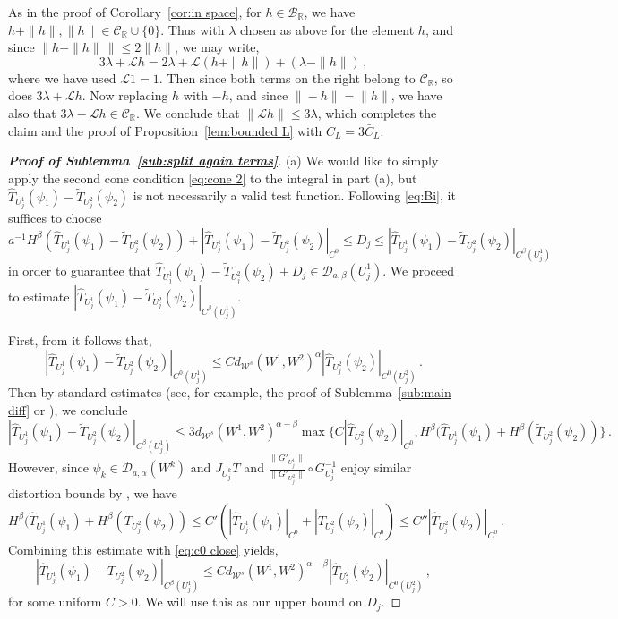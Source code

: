 \documentclass{amsart}
\numberwithin{equation}{section}
\newcommand\cB{{\mathcal B}}
\newcommand\cC{{\mathcal C}}
\newcommand\cD{{\mathcal D}}
\newcommand\cL{{\mathcal L}}
\newcommand\cW{{\mathcal W}}
\newcommand\bR{{\mathbb R}}
\newcommand\tT{\widetilde{T}}
\newcommand{\hT}{\widehat{T}}
\begin{document}
As in the proof of Corollary~\ref{cor:in space}, for $h \in \cB_{\bR}$, we have 
$h + \| h \|, \| h \| \in \cC_{\bR} \cup \{ 0 \}$.  Thus with $\lambda$ chosen as above for the element
$h$, and since $\| h + \| h \| \, \| \le 2 \| h\|$, we may write,
\[
3\lambda + \cL h = 2\lambda + \cL (h + \| h \|) + (\lambda - \| h \|) \, ,
\]
where we have used $\cL 1 = 1$.  Then since both terms on the right belong to $\cC_{\bR}$,
so does $3 \lambda + \cL h$.  Now replacing $h$ with $-h$, and since $\| -h \| = \| h \|$, we have
also that $3\lambda - \cL h \in \cC_{\bR}$.  We conclude that $\| \cL h \| \le 3\lambda$,
which completes the claim and the proof of 
Proposition~\ref{lem:bounded L} with $C_L = 3 \bar C_L$.
\begin{proof}[\bf \em Proof of Sublemma~\ref{sub:split again terms}]
(a)  We would like to simply apply the second cone condition \eqref{eq:cone 2} to the integral
in part (a), but $\hT_{U^1_j}(\psi_1) - \tT_{U^2_j}(\psi_2)$ is not necessarily a valid test function.
Following \eqref{eq:Bi}, it suffices to choose 
\[
a^{-1} H^\beta(\hT_{U^1_j}(\psi_1) - \tT_{U^2_j}(\psi_2))
+ |\hT_{U^1_j}(\psi_1) - \tT_{U^2_j}(\psi_2)|_{C^0} \le D_j \le |\hT_{U^1_j}(\psi_1) - \tT_{U^2_j}(\psi_2)|_{C^\beta(U^1_j)}
\]
in order to guarantee that $\hT_{U^1_j}(\psi_1) - \tT_{U^2_j}(\psi_2) + D_j \in \cD_{a, \beta}(U^1_j)$.
We proceed to estimate $|\hT_{U^1_j}(\psi_1) - \tT_{U^2_j}(\psi_2)|_{C^\beta(U^1_j)}$.

First, from \cite[eq.~(5.18)]{DL22} it follows that,
\begin{equation}
\label{eq:c0 close}
|\hT_{U^1_j}(\psi_1) - \tT_{U^2_j}(\psi_2)|_{C^0(U^1_j)} \le C d_{\cW^s}(W^1, W^2)^\alpha 
|\hT_{U^2_j}(\psi_2)|_{C^0(U^2_j)} \, .
\end{equation}
Then by standard estimates (see, for example, the proof of Sublemma~\ref{sub:main diff} or
\cite[Lemma~4.3]{DZ13}), we conclude
\[
|\hT_{U^1_j}(\psi_1) - \tT_{U^2_j}(\psi_2)|_{C^\beta(U^1_j)} 
\le 3 d_{\cW^s}(W^1, W^2)^{\alpha-\beta} \max \{ C |\hT_{U^2_j}(\psi_2)|_{C^0}, H^\beta(\hT_{U^1_j}(\psi_1) + H^\beta(\tT_{U^2_j}(\psi_2)) \} \, . 
\]
However, since $\psi_k \in \cD_{a, \alpha}(W^k)$ and $J_{U^k_j}T$ and 
$\frac{\| G'_{U^1_j} \| }{\| G'_{U^2_j} \| } \circ G_{U^1_j}^{-1}$ enjoy 
similar distortion bounds by \cite[Lemma~5.5]{DL22}, we have
\[
H^\beta(\hT_{U^1_j}(\psi_1) + H^\beta(\tT_{U^2_j}(\psi_2))
\le C' ( |\hT_{U^1_j}(\psi_1)|_{C^0} + |\tT_{U^2_j}(\psi_2)|_{C^0} )
\le C'' |\hT_{U^2_j}(\psi_2)|_{C^0} \, .
\]
Combining this estimate with \eqref{eq:c0 close} yields,
\begin{equation}
\label{eq:Holder ok}
|\hT_{U^1_j}(\psi_1) - \tT_{U^2_j}(\psi_2)|_{C^\beta(U^1_j)}
\le C d_{\cW^s}(W^1, W^2)^{\alpha - \beta} |\hT_{U^2_j}(\psi_2)|_{C^0(U^2_j)} \, ,
\end{equation}
for some uniform $C>0$.  We will use this as our upper bound on $D_j$.


\end{proof}
\end{document}
